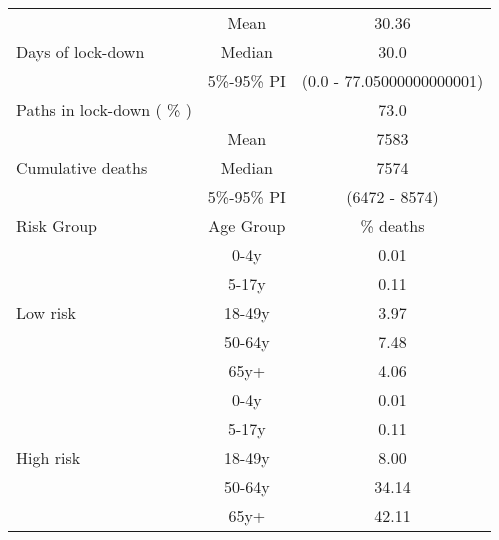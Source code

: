 \documentclass{article}
\begin{document}
\begin{table}[th]
\centering
\begin{tabular}{p{4cm}cc}
\toprule
\multirow{3}{*}{Days   of lock-down} & Mean      & 30.36                        \\ \cmidrule(l){2-3} 
                                     & Median    & 30.0                      \\ \cmidrule(l){2-3} 
                                     & 5\%-95\% PI & (0.0 - 77.05000000000001)       \\ \midrule 
\multirow{1}{*}{Paths in lock-down ( \% )} &      &         73.0              \\   \midrule                     
\multirow{3}{\hsize}{Cumulative deaths}       & Mean      & 7583 \\ \cmidrule(l){2-3} 
                                     & Median    & 7574                        \\ \cmidrule(l){2-3} 
                                     & 5\%-95\% PI & (6472 - 8574)           \\  \midrule
Risk Group                           & Age Group & \multicolumn{1}{c}{\% deaths}        \\  \midrule
\multirow{5}{*}{Low   risk}          & 0-4y      & 0.01                         \\ \cmidrule(l){2-3} 
                                     & 5-17y     & 0.11                         \\ \cmidrule(l){2-3} 
                                     & 18-49y    & 3.97                         \\ \cmidrule(l){2-3} 
                                     & 50-64y    & 7.48                         \\ \cmidrule(l){2-3} 
                                     & 65y+      & 4.06                         \\ \midrule
\multirow{5}{*}{High   risk}         & 0-4y      & 0.01                         \\ \cmidrule(l){2-3} 
                                     & 5-17y     & 0.11                         \\ \cmidrule(l){2-3} 
                                     & 18-49y    & 8.00                         \\ \cmidrule(l){2-3} 
                                     & 50-64y    & 34.14                         \\ \cmidrule(l){2-3} 
                                     & 65y+      & 42.11                         \\ \midrule

\end{tabular}
\end{table}
\end{document}
